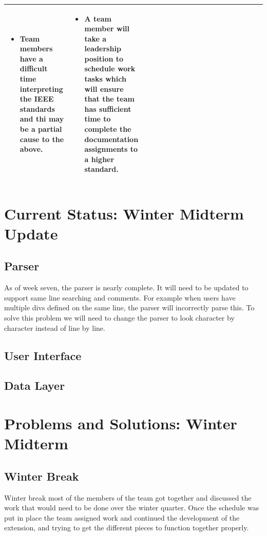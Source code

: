 \documentclass[letterpaper,10pt,titlepage,draftclsnofoot,onecolumn,onesided] {IEEEtran}
\begin{document}
\begin{center}
\begin{singlespace}
\begin{tabular}{ |  p{0.25\linewidth}  |  p{0.25\linewidth}  | p{0.25\linewidth} | p{0.25\linewidth} |}
\begin{itemize}
				\item Team members have a difficult time interpreting the IEEE standards and thi may be a partial cause to the above.
			\end{itemize}
		&
			\begin{itemize}
				\item A team member will take a leadership position to schedule work tasks which will ensure that the team has sufficient time to complete the documentation assignments to a higher standard. 
			\end{itemize} 
		\\ \hline
		\end{tabular}
		\end{singlespace}
	\end{center}

\section{Current Status: Winter Midterm Update}

	\subsection{Parser}
	As of week seven, the parser is nearly complete.
	It will need to be updated to support same line searching and comments.
	For example when users have multiple divs defined on the same line, the parser will incorrectly parse this.
	To solve this problem we will need to change the parser to look character by character instead of line by line.
	

	\subsection{User Interface}

	\subsection{Data Layer}

\section{Problems and Solutions: Winter Midterm }
	\subsection{Winter Break}
	Winter break most of the members of the team got together and discussed the work that would need to be done over the winter quarter.
	Once the schedule was put in place the team assigned work and continued the development of the extension, and trying to get the different pieces to function together properly. 
	
\end{document}
